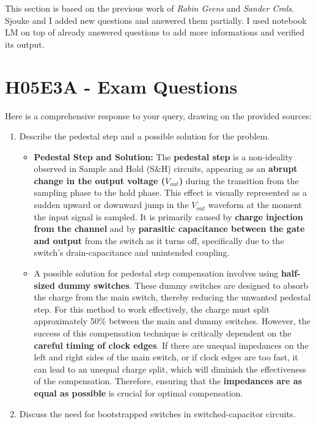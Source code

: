 \documentclass[
  a4paper,
]{article}
\begin{document}
This section is based on the previous work of \emph{Robin Geens} and
\emph{Sander Crols}. Sjouke and I added new questions and answered them
partially. I used notebook LM on top of already answered questions to
add more informations and verified its output.

\hypertarget{h05e3a---exam-questions}{%
\section{H05E3A - Exam Questions}\label{h05e3a---exam-questions}}

Here is a comprehensive response to your query, drawing on the provided
sources:

\begin{enumerate}
\def\labelenumi{\arabic{enumi}.}
\item
  Describe the pedestal step and a possible solution for the problem.

  \begin{itemize}
  \item
    \textbf{Pedestal Step and Solution:} The \textbf{pedestal step} is a
    non-ideality observed in Sample and Hold (S\&H) circuits, appearing
    as an \textbf{abrupt change in the output voltage (\(V_{out}\))}
    during the transition from the sampling phase to the hold phase.
    This effect is visually represented as a sudden upward or downward
    jump in the \(V_{out}\) waveform at the moment the input signal is
    sampled. It is primarily caused by \textbf{charge injection from the
    channel} and by \textbf{parasitic capacitance between the gate and
    output} from the switch as it turns off, specifically due to the
    switch's drain-capacitance and unintended coupling.
  \item
    A possible solution for pedestal step compensation involves using
    \textbf{half-sized dummy switches}. These dummy switches are
    designed to absorb the charge from the main switch, thereby reducing
    the unwanted pedestal step. For this method to work effectively, the
    charge must split approximately 50\% between the main and dummy
    switches. However, the success of this compensation technique is
    critically dependent on the \textbf{careful timing of clock edges}.
    If there are unequal impedances on the left and right sides of the
    main switch, or if clock edges are too fast, it can lead to an
    unequal charge split, which will diminish the effectiveness of the
    compensation. Therefore, ensuring that the \textbf{impedances are as
    equal as possible} is crucial for optimal compensation.
  \end{itemize}
\item
  Discuss the need for bootstrapped switches in switched-capacitor
  circuits.


\end{enumerate}
\end{document}

